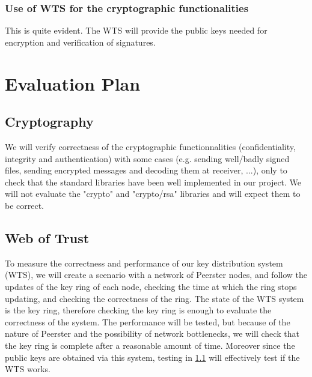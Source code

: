 \documentclass[]{article}
\begin{document}
\subsubsection{Use of WTS for the cryptographic functionalities}
This is quite evident. The WTS will provide the public keys needed for encryption and verification of signatures.

\section{Evaluation Plan}

\subsection{Cryptography}
\label{sec:crypt-test}
We will verify correctness of the cryptographic functionnalities (confidentiality, integrity and authentication) with some cases (e.g. sending well/badly signed files, sending encrypted messages and decoding them at receiver, ...), only to check that the standard libraries have been well implemented in our project. We will not evaluate the "crypto" and "crypto/rsa" libraries and will expect them to be correct.

\subsection{Web of Trust}
To measure the correctness and performance of our key distribution system (WTS), we will create a scenario with a network of Peerster nodes, and follow the updates of the key ring of each node, checking the time at which the ring stops updating, and checking the correctness of the ring. The state of the WTS system is the key ring, therefore checking the key ring is enough to evaluate the correctness of the system. The performance will be tested, but because of the nature of Peerster and the possibility of network bottlenecks, we will check that the key ring is complete after a reasonable amount of time. Moreover since the public keys are obtained via this system, testing in \ref{sec:crypt-test} will effectively test if the WTS works.

{}

\end{document}
